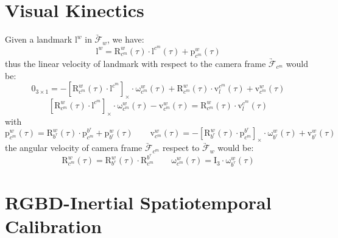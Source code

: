 \documentclass[12pt, onecolumn]{article}
\newcommand\liehat[1]{\left[ #1 \right]_\times}
\newcommand\bsm[1]{\boldsymbol{\mathrm{#1}}}
\newcommand\rotation[2]{{\bsm{R}_{#1}^{#2}}}
\newcommand\angvel[2]{{\bsm{\omega}_{#1}^{#2}}}
\newcommand\translation[2]{{\bsm{p}_{#1}^{#2}}}
\newcommand\linvel[2]{{\bsm{v}_{#1}^{#2}}}
\newcommand\coordframe[1]{\underrightarrow{\mathcal{F}}_{#1}}
\begin{document}
	\section{Visual Kinectics}
	Given a landmark $\bsm{l}^{w}$ in $\coordframe{w}$, we have:
	\begin{equation}
	\bsm{l}^{w}=\rotation{c^m}{w}(\tau)\cdot\bsm{l}^{c^m}(\tau)+\translation{c^m}{w}(\tau)
	\end{equation}
	thus the linear velocity of landmark with respect to the camera frame $\coordframe{c^m}$ would be:
	\begin{equation}
	\bsm{0}_{3\times 1}=-\liehat{\rotation{c^m}{w}(\tau)\cdot\bsm{l}^{c^m}}\cdot\angvel{c^m}{w}(\tau)+\rotation{c^m}{w}(\tau)\cdot\linvel{l}{c^m}(\tau)+\linvel{c^m}{w}(\tau)
	\end{equation}
	\begin{equation}
	\liehat{\rotation{c^m}{w}(\tau)\cdot\bsm{l}^{c^m}}\cdot\angvel{c^m}{w}(\tau)-\linvel{c^m}{w}(\tau)=\rotation{c^m}{w}(\tau)\cdot\linvel{l}{c^m}(\tau)
	\end{equation}
	with
	\begin{equation}
	\translation{c^m}{w}(\tau)=\rotation{b^r}{w}(\tau)\cdot\translation{c^m}{b^r}+\translation{b^r}{w}(\tau)
	\qquad
	\linvel{c^m}{w}(\tau)=-\liehat{\rotation{b^r}{w}(\tau)\cdot\translation{c^m}{b^r}}\cdot\angvel{b^r}{w}(\tau)+\linvel{b^r}{w}(\tau)
	\end{equation}
	the angular velocity of camera frame $\coordframe{c^m}$ respect to $\coordframe{w}$ would be:
	\begin{equation}
	\rotation{c^m}{w}(\tau)=\rotation{b^r}{w}(\tau)\cdot\rotation{c^m}{b^r}
	\qquad
	\angvel{c^m}{w}(\tau)=\bsm{I}_{3}\cdot\angvel{b^r}{w}(\tau)
	\end{equation}
	
	\section{RGBD-Inertial Spatiotemporal Calibration}
\end{document}
